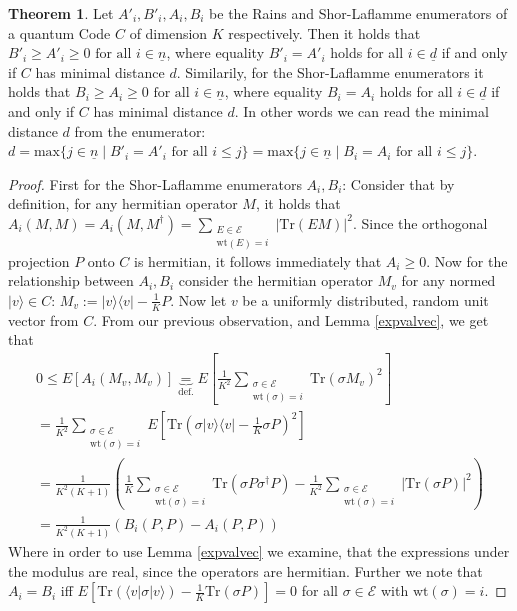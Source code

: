 \documentclass[12pt,a4paper,BCOR15mm,twoside,DIV12]{article}
\def\E{\mathcal{E}}
\def\n{\underline{n}}
\def\fa{\text{ for all }}
\def\Tr{\text{Tr}}
\def\wt{\text{wt}}
\theoremstyle{definition}
\newtheorem{theorem}[Satz]{Theorem}
\begin{document}
\begin{theorem}\label{distancenums}
Let $A'_i, B'_i, A_i, B_i$ be the Rains and Shor-Laflamme enumerators of a quantum Code $C$ of dimension $K$ respectively. Then it holds that $B'_i \geq A'_i \geq 0 \fa i \in \n$, where equality $B'_i = A'_i$  holds for all $i \in \underline{d}$ if and only if $C$ has minimal distance $d$. 
Similarily, for the Shor-Laflamme enumerators it holds that $B_i \geq A_i \geq 0 \fa i \in \n$, where equality $B_i = A_i$  holds for all $i \in \underline{d}$ if and only if $C$ has minimal distance $d$. In other words we can read the minimal distance $d$ from the enumerator: $d = \text{max}\{ j \in \n \mid B'_i = A'_i \fa i \leq j \} = \text{max}\{ j \in \n \mid B_i = A_i \fa i \leq j \}$.
\begin{proof}
First for the Shor-Laflamme enumerators $A_i, B_i$: Consider that by definition, for any hermitian operator $M$, it holds that $A_i(M,M) = A_i(M,M^\dagger) = \sum_{\substack{E \in \mathcal{E} \\ \wt(E) = i}} |\Tr(EM)|^2$. Since the orthogonal projection $P$ onto $C$ is hermitian,
it follows immediately that $A_i \geq 0$. Now for the relationship between $A_i,B_i$ consider the hermitian operator $M_v$ for any normed $|v \rangle \in C$: $M_v:= |v\rangle \langle v| - \frac{1}{K}P$. Now let $v$ be a uniformly distributed, random unit vector from $C$.
From our previous observation, and Lemma \ref{expvalvec}, we get that
\begin{align*} 0 \leq E[A_i(M_v,M_v)] \underbrace{=}_{\text{def.}} E[\frac{1}{K^2} \sum_{\substack{\sigma \in \mathcal{E} \\ \wt(\sigma) = i}} \Tr(\sigma M_v)^2] \\ = \frac{1}{K^2}  \sum_{\substack{\sigma \in \mathcal{E} \\ \wt(\sigma) = i}} E[\Tr(\sigma |v\rangle \langle v| - \frac{1}{K} \sigma P)^2] \\
 = \frac{1}{K^2(K+1)}(\frac{1}{K} \sum_{\substack{\sigma \in \mathcal{E} \\ \wt(\sigma) = i}}  \Tr(\sigma P \sigma^\dagger P) - \frac{1}{K^2}\sum_{\substack{\sigma \in \mathcal{E} \\ \wt(\sigma) = i}} |\Tr(\sigma P)|^2) \\ = \frac{1}{K^2(K+1)} (B_i(P,P) - A_i(P,P)) \end{align*}
Where in order to use Lemma \ref{expvalvec} we examine, that the expressions under the modulus are real, since the operators are hermitian. Further we note that $A_i = B_i$ iff $E[\Tr (\langle v | \sigma |v \rangle) - \frac{1}{K} \Tr(\sigma P)] = 0$ for all $\sigma \in \E$ with $\wt(\sigma) = i$.

\end{proof}
\end{theorem}
\end{document}
